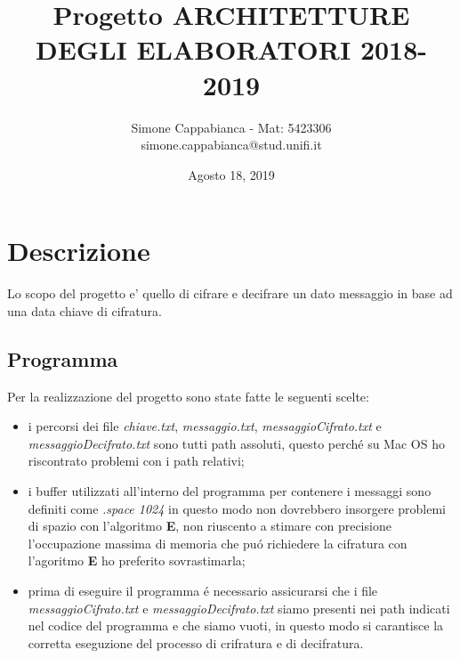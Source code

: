 \documentclass[11pt, oneside]{article}   	%
\title{Progetto ARCHITETTURE DEGLI ELABORATORI 2018-2019}
\author{Simone Cappabianca - Mat: 5423306 \\  simone.cappabianca@stud.unifi.it}
\date{Agosto 18, 2019}							%
\begin{document}
\maketitle
\newpage

\tableofcontents
\newpage

\section{Descrizione}
Lo scopo del progetto e' quello di cifrare e decifrare un dato messaggio in base ad una data chiave di cifratura.

\subsection{Programma}

Per la realizzazione del progetto sono state fatte le seguenti scelte:
\begin{itemize}
	\item i percorsi dei file \textit{chiave.txt}, \textit{messaggio.txt}, \textit{messaggioCifrato.txt} e \textit{messaggioDecifrato.txt} sono tutti path assoluti, questo perch\'e su Mac OS ho riscontrato problemi con i path relativi;
	\item i buffer utilizzati all'interno del programma per contenere i messaggi sono definiti come \textit{.space 1024} in questo modo non dovrebbero insorgere problemi di spazio con l'algoritmo \textbf{E}, non riuscento a stimare con precisione l'occupazione massima di memoria che pu\'o richiedere la cifratura con l'agoritmo \textbf{E} ho preferito sovrastimarla;
	\item prima di eseguire il programma \'e necessario assicurarsi che i file \textit{messaggioCifrato.txt} e \textit{messaggioDecifrato.txt} siamo presenti nei path indicati nel codice del programma e che siamo vuoti, in questo modo si carantisce la corretta eseguzione del processo di crifratura e di decifratura. 
\end{itemize} 
\end{document}
